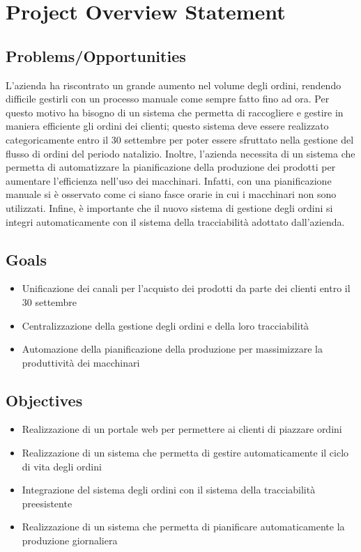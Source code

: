 \chapter{Project Overview Statement}
\label{app:pos}

\section{Problems/Opportunities}
L'azienda ha riscontrato un grande aumento nel volume degli ordini, rendendo difficile gestirli con un processo manuale come sempre fatto fino ad ora.
Per questo motivo ha bisogno di un sistema che permetta di raccogliere e gestire in maniera efficiente gli ordini dei clienti; questo sistema deve essere realizzato categoricamente entro il 30 settembre per poter essere sfruttato nella gestione del flusso di ordini del periodo natalizio. Inoltre, l'azienda necessita di un sistema che permetta di automatizzare la pianificazione della produzione dei prodotti per aumentare l'efficienza nell'uso dei macchinari. Infatti, con una pianificazione manuale si è osservato come ci siano fasce orarie in cui i macchinari non sono utilizzati.
Infine, è importante che il nuovo sistema di gestione degli ordini si integri automaticamente con il sistema della tracciabilità adottato dall'azienda.

\section{Goals}
\begin{itemize}
  \item Unificazione dei canali per l'acquisto dei prodotti da parte dei clienti entro il 30 settembre
  \item Centralizzazione della gestione degli ordini e della loro tracciabilità
  \item Automazione della pianificazione della produzione per massimizzare la produttività dei macchinari
\end{itemize}

\section{Objectives}
\begin{itemize}
  \item Realizzazione di un portale web per permettere ai clienti di piazzare ordini
  \item Realizzazione di un sistema che permetta di gestire automaticamente il ciclo di vita degli ordini
  \item Integrazione del sistema degli ordini con il sistema della tracciabilità preesistente
  \item Realizzazione di un sistema che permetta di pianificare automaticamente la produzione giornaliera
\end{itemize}

